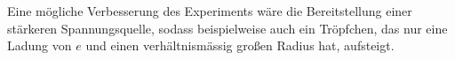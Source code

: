 \documentclass[
	a4paper,
	12pt,
	pagesize,
	ngerman
]{scrartcl}
\begin{document}
	Eine mögliche Verbesserung des Experiments wäre die Bereitstellung einer stärkeren Spannungsquelle, sodass beispielweise auch ein Tröpfchen, das nur eine Ladung von $e$ und einen verhältnismässig großen Radius hat, aufsteigt.

	

	\printbibliography
\end{document}
